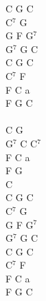 \documentclass[a5paper, 10pt]{book}
\begin{document}
\begin{minipage}[t]{0.2\textwidth}
  C G C\\
  C$^7$ G\\
  G F G$^7$\\
  G$^7$ G C\\
  C G C\\
  C$^7$ F\\
  F C a\\
  F G C\\
  \\
  C G\\
  G$^7$ C C$^7$\\
  F C a\\
  F G\\
  C\\

  C G C\\
  C$^7$ G\\
  G F G$^7$\\
  G$^7$ G C\\
  C G C\\
  C$^7$ F\\
  F C a\\
  F G C\\
\end{minipage}

\newpage
\end{document}
